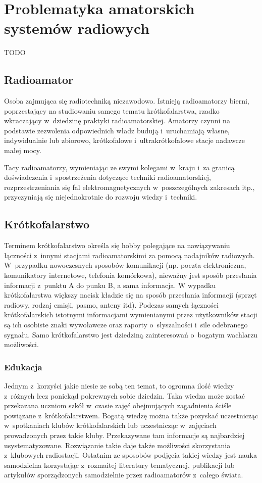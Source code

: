 \documentclass[eng,oneside]{mgr}
\begin{document}
	\chapter{Problematyka amatorskich systemów radiowych}
	\label{sec:teoretical_description}
	TODO
		
		\section{Radioamator}
		Osoba zajmująca się radiotechniką niezawodowo. Istnieją radioamatorzy bierni, poprzestający na studiowaniu samego tematu krótkofalarstwa, rzadko wkraczający w~dziedzinę praktyki radioamatorskiej. Amatorzy czynni na podstawie zezwolenia odpowiednich władz budują i~uruchamiają własne, indywidualnie lub zbiorowo, krótkofalowe i~ultrakrótkofalowe stacje nadawcze małej mocy.

		Tacy radioamatorzy, wymieniając ze swymi kolegami w~kraju i~za granicą doświadczenia i~spostrzeżenia dotyczące techniki radioamatorskiej, rozprzestrzeniania się fal elektromagnetycznych w~poszczególnych zakresach itp., przyczyniają się niejednokrotnie do rozwoju wiedzy i~techniki. 

		\section{Krótkofalarstwo}
		Terminem krótkofalarstwo określa się hobby polegające na nawiązywaniu łączności z~innymi stacjami radioamatorskimi za pomocą nadajników radiowych. W~przypadku nowoczesnych sposobów komunikacji (np. poczta elektroniczna, komunikatory internetowe, telefonia komórkowa), nieważny jest sposób przesłania informacji z~punktu A do punku B, a sama informacja. W wypadku krótkofalarstwa większy nacisk kładzie się na sposób przesłania informacji (sprzęt radiowy, rodzaj emisji, pasmo, anteny itd). Podczas samych łączności krótkofalarskich istotnymi informacjami wymienianymi przez użytkowników stacji są ich osobiste znaki wywoławcze oraz raporty o~słyszalności i~sile odebranego sygnału. Samo krótkofalarstwo jest dziedziną zainteresowań o~bogatym wachlarzu możliwości. 

			\subsection{Edukacja}
			Jednym z~korzyści jakie niesie ze sobą ten temat, to ogromna ilość wiedzy z~różnych lecz poniekąd pokrewnych sobie dziedzin. Taka wiedza może zostać przekazana uczniom szkół w~czasie zajęć obejmujących zagadnienia ściśle powiązane z~krótkofalarstwem. Bogatą wiedzę można także pozyskać uczestnicząc w~spotkaniach klubów krótkofalarskich lub uczestnicząc w~zajęciach prowadzonych przez takie kluby. Przekazywane tam informacje są najbardziej usystematyzowane. Rozwiązanie takie daje także możliwości skorzystania z~klubowych radiostacji. Ostatnim ze sposobów podjęcia takiej wiedzy jest nauka samodzielna korzystając z~rozmaitej literatury tematycznej, publikacji lub artykułów sporządzonych samodzielnie przez radioamatorów z~całego świata. 
\end{document}
